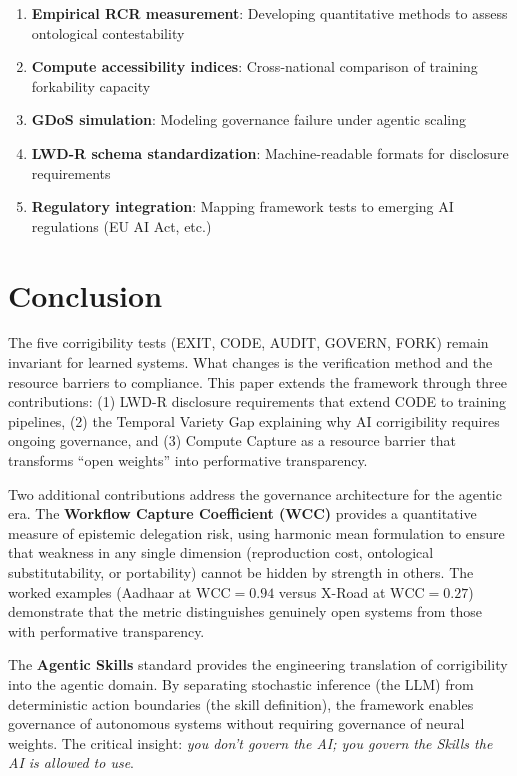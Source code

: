 \documentclass[11pt,a4paper]{article}
\theoremstyle{definition}
\begin{document}
\begin{enumerate}[noitemsep]
    \item \textbf{Empirical RCR measurement}: Developing quantitative methods to assess ontological contestability
    \item \textbf{Compute accessibility indices}: Cross-national comparison of training forkability capacity
    \item \textbf{GDoS simulation}: Modeling governance failure under agentic scaling
    \item \textbf{LWD-R schema standardization}: Machine-readable formats for disclosure requirements
    \item \textbf{Regulatory integration}: Mapping framework tests to emerging AI regulations (EU AI Act, etc.)
\end{enumerate}

\section{Conclusion}

The five corrigibility tests (EXIT, CODE, AUDIT, GOVERN, FORK) remain invariant for learned systems. What changes is the verification method and the resource barriers to compliance. This paper extends the framework through three contributions: (1) LWD-R disclosure requirements that extend CODE to training pipelines, (2) the Temporal Variety Gap explaining why AI corrigibility requires ongoing governance, and (3) Compute Capture as a resource barrier that transforms ``open weights'' into performative transparency.

Two additional contributions address the governance architecture for the agentic era. The \textbf{Workflow Capture Coefficient (WCC)} provides a quantitative measure of epistemic delegation risk, using harmonic mean formulation to ensure that weakness in any single dimension (reproduction cost, ontological substitutability, or portability) cannot be hidden by strength in others. The worked examples (Aadhaar at $\text{WCC} = 0.94$ versus X-Road at $\text{WCC} = 0.27$) demonstrate that the metric distinguishes genuinely open systems from those with performative transparency.

The \textbf{Agentic Skills} standard \citep{agentskills2025} provides the engineering translation of corrigibility into the agentic domain. By separating stochastic inference (the LLM) from deterministic action boundaries (the skill definition), the framework enables governance of autonomous systems without requiring governance of neural weights. The critical insight: \textit{you don't govern the AI; you govern the Skills the AI is allowed to use}.
\end{document}

